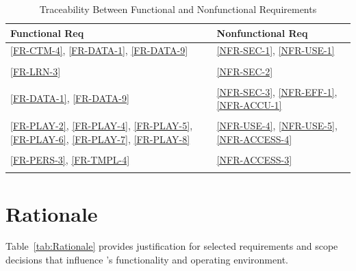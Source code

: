 \documentclass[12pt]{article}
\begin{document}
\begin{longtable}{p{} p{}}

\toprule
Functional Req & Nonfunctional Req \\
\midrule
\ref{FR-CTM-4}, \ref{FR-DATA-1}, \ref{FR-DATA-9} & \ref{NFR-SEC-1}, \ref{NFR-USE-1} \\
\\
\ref{FR-LRN-3} & \ref{NFR-SEC-2} \\
\\
\ref{FR-DATA-1}, \ref{FR-DATA-9} & \ref{NFR-SEC-3}, \ref{NFR-EFF-1}, \ref{NFR-ACCU-1} \\
\\
\ref{FR-PLAY-2}, \ref{FR-PLAY-4}, \ref{FR-PLAY-5}, \ref{FR-PLAY-6}, \ref{FR-PLAY-7}, \ref{FR-PLAY-8} & \ref{NFR-USE-4}, \ref{NFR-USE-5}, \ref{NFR-ACCESS-4} \\
\\
\ref{FR-PERS-3}, \ref{FR-TMPL-4} & \ref{NFR-ACCESS-3} \\
\bottomrule
\caption{Traceability Between Functional and Nonfunctional Requirements}
\label{tab:FR2NFRtm}

\end{longtable}


\section{Rationale}

Table~\ref{tab:Rationale} provides justification for selected requirements and
scope decisions that influence \progname{}'s functionality and operating
environment.
\end{document}
